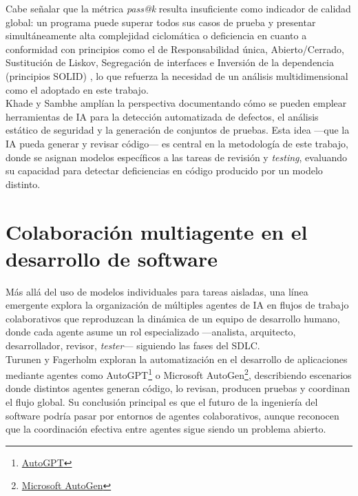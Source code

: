 Cabe señalar que la métrica \textit{pass@k} \cite{Chen:2021:Codex} resulta insuficiente como indicador de calidad global: un programa puede superar todos sus casos de prueba y presentar simultáneamente alta complejidad ciclomática o deficiencia en cuanto a conformidad con principios como 
el de Responsabilidad única,
Abierto/Cerrado, 
Sustitución de Liskov, 
Segregación de interfaces 
e 
Inversión de la dependencia
(principios SOLID) \cite{Martin:2003:Agile},
lo que refuerza la necesidad de un análisis multidimensional como el adoptado en este trabajo.\\

Khade y Sambhe \cite{Khade:2025:AIinSD} amplían la perspectiva documentando cómo se pueden emplear herramientas de \ac{IA} para la detección automatizada de defectos, el análisis estático de seguridad y la generación de conjuntos de pruebas. Esta idea ---que la \ac{IA} pueda generar y revisar código--- es central en la metodología de este trabajo, donde se asignan modelos específicos a las tareas de revisión y \textit{testing}, evaluando su capacidad para detectar deficiencias en código producido por un modelo distinto.

\section{Colaboración multiagente en el desarrollo de software} \label{sec:colaboracion-multiagente}

Más allá del uso de modelos individuales para tareas aisladas, una línea emergente explora la organización de múltiples agentes de \ac{IA} en flujos de trabajo colaborativos que reproduzcan la dinámica de un equipo de desarrollo humano, donde cada agente asume un rol especializado ---analista, arquitecto, desarrollador, revisor, \textit{tester}--- siguiendo las fases del \ac{SDLC}.\\

Turunen y Fagerholm \cite{Turunen:2023:FromIdeas} exploran la automatización en el desarrollo de aplicaciones mediante agentes como AutoGPT\footnote{\href{https://agpt.co}{AutoGPT}} o Microsoft AutoGen\footnote{\href{https://www.microsoft.com/research/project/autogen}{Microsoft AutoGen}}, describiendo escenarios donde distintos agentes generan código, lo revisan, producen pruebas y coordinan el flujo global. Su conclusión principal es que el futuro de la ingeniería del software podría pasar por entornos de agentes colaborativos, aunque reconocen que la coordinación efectiva entre agentes sigue siendo un problema abierto.\\

